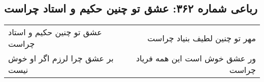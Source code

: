 \begin{center}
\section*{رباعی شماره ۳۶۲: عشق تو چنین حکیم و استاد چراست}
\label{sec:0362}
\begin{longtable}{l p{0.5cm} r}
عشق تو چنین حکیم و استاد چراست
&&
مهر تو چنین لطیف بنیاد چراست
\\
بر عشق چرا لرزم اگر او خوش نیست
&&
ور عشق خوش است این همه فریاد چراست
\\
\end{longtable}
\end{center}
